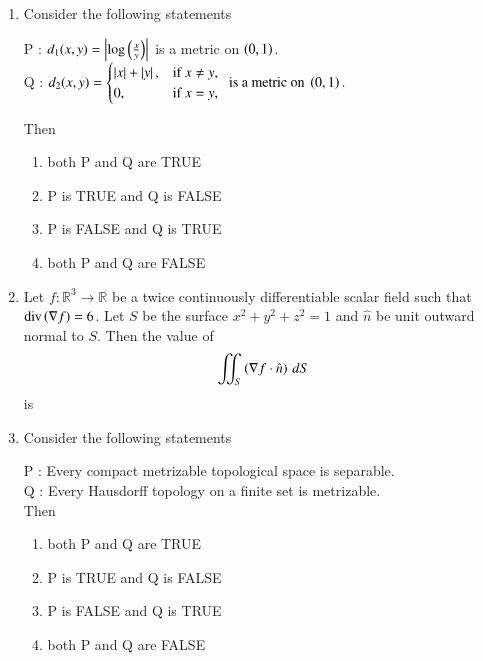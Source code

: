 \documentclass[journal,12pt,onecolumn]{IEEEtran}
\theoremstyle{remark}
\begin{document}
\begin{enumerate}[start=1, label=Q.\arabic*]
\hfill{}


\item Consider the following statements\brak{:}

P : $d_{1}(x,y)=\left\vert\log\left(\tfrac{x}{y}\right)\right\vert$ is a metric on $\left(0,1\right)$.\\
Q : $d_{2}(x,y)=
\begin{cases}
\left\vert x\right\vert+\left\vert y\right\vert, & \text{if } x \ne y,\\
0, & \text{if } x=y,
\end{cases}
\ \ \text{is a metric on } \left(0,1\right).
$

Then
\begin{enumerate}
\item both P and Q are TRUE
\item P is TRUE and Q is FALSE
\item P is FALSE and Q is TRUE
\item both P and Q are FALSE
\end{enumerate}

\hfill{}
\item Let $f : \mathbb{R}^{3}\to \mathbb{R}$ be a twice continuously differentiable scalar field such that $\text{div}\left(\nabla f\right)=6$.  
Let $S$ be the surface $x^{2}+y^{2}+z^{2}=1$ and $\hat{n}$ be unit outward normal to $S$.  
Then the value of 
\[
\iint_{S}\left(\nabla f \cdot \hat{n}\right)\, dS
\] 
is
\begin{enumerate}
\end{enumerate}

\hfill{}


\item Consider the following statements\brak{:}

P : Every compact metrizable topological space is separable.\\
Q : Every Hausdorff topology on a finite set is metrizable.\\

Then
\begin{enumerate}
\item both P and Q are TRUE
\item P is TRUE and Q is FALSE
\item P is FALSE and Q is TRUE
\item both P and Q are FALSE
\end{enumerate}


\end{enumerate}
\end{document}
